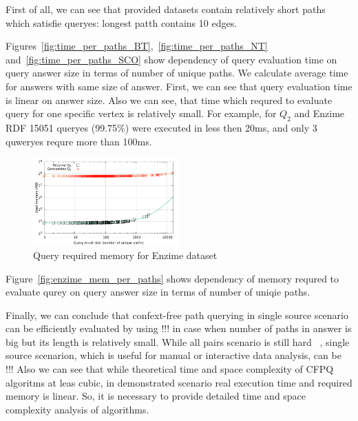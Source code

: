 First of all, we can see that provided datasets contain relatively short paths which satisfie queryes: longest patth contains 10 edges. 

Figures~\ref{fig:time_per_paths_BT},~\ref{fig:time_per_paths_NT} and~\ref{fig:time_per_paths_SCO} show dependency of query evaluation time on query answer size in terms of number of unique paths.
We calculate average time for answers with same size of answer.
First, we can see that query evaluation time is linear on answer size. 
Also we can see, that time which requred to evaluate query for one specific vertex is relatively small.
For example, for $Q_2$ and Enzime RDF 15051 queryes (99.75\%) were executed in less then 20ms, and only 3 quweryes requre more than 100ms. 

\begin{figure}[ht]
  \begin{center}
    \includegraphics[width=0.5\textwidth]{data/mem_per_paths_BT.pdf}
    \caption{Query required memory for Enzime dataset}
    \label{fig:mem_per_paths_BT}
  \end{center}
\end{figure}

Figure~\ref{fig:enzime_mem_per_paths} shows dependency of memory requred to evaluate qurey on query answer size in terms of number of uniqie paths.

Finally, we can conclude that confext-free path querying in single source scenario can be efficiently evaluated by using !!! in case when number of paths in answer is big but its length is relatively small.
While all pairs scenario is still hard ~\cite{!!!}, single source scenarion, which is useful for manual or interactive data analysis, can be !!!
Also we can see that while theoretical time and space complexity of CFPQ algoritms at leas cubic, in demonstrated scenario real execution time and required memory is linear.
So, it is necessary to provide detailed time and space complexity analysis of algorithms.
